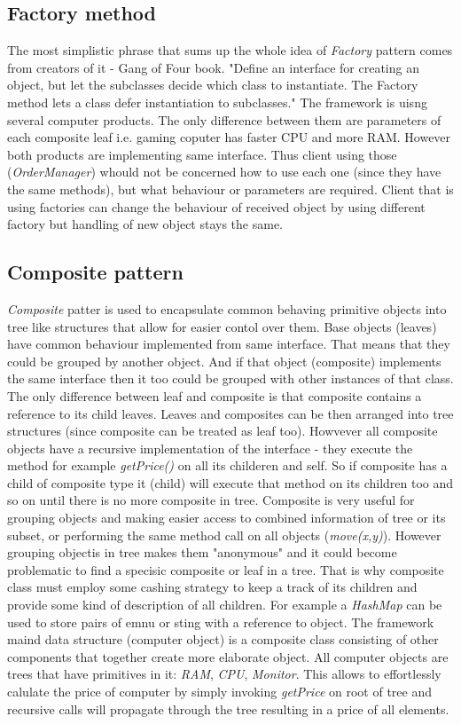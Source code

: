 \documentclass[pdftex,11pt,a4paper]{article}
\begin{document}
\subsection{Factory method}
The most simplistic phrase that sums up the whole idea of \emph{Factory} pattern comes from creators of it - Gang of Four book.
"Define an interface for creating an object, but let the subclasses decide which class to instantiate. The Factory method lets a class defer instantiation to subclasses."\cite{GOF_wika}
The framework is uisng several computer products. The only difference between them are parameters of each composite leaf i.e. gaming coputer has faster CPU and more RAM. However both products are implementing same interface. Thus client using those (\emph{OrderManager}) whould not be concerned how to use each one (since they have the same methods), but what behaviour or parameters are required. 
Client that is using factories can change the behaviour of received object by using different factory but handling of new object stays the same.

\subsection{Composite pattern}
\emph{Composite} patter is used to encapsulate common behaving primitive objects into tree like structures that allow for easier contol over them. Base objects (leaves) have common behaviour implemented from same interface. That means that they could be grouped by another object. And if that object (composite) implements the same interface then it too could be grouped with other instances of that class. The only difference between leaf and composite is that composite contains a reference to its child leaves.
Leaves and composites can be then arranged into tree structures (since composite can be treated as leaf too). Howvever all composite objects have a recursive implementation of the interface - they execute the method for example \emph{getPrice()} on all its childeren and self. So if composite has a child of composite type it (child) will execute that method on its children too and so on until there is no more composite in tree. 
Composite is very useful for grouping objects and making easier access to combined information of tree or its subset, or performing the same method call on all objects (\emph{move(x,y)}). 
However grouping objectis in tree makes them "anonymous" and it could become problematic to find a specisic composite or leaf in a tree. That is why composite class must employ some cashing strategy to keep a track of its children and provide some kind of description of all children. For example a \emph{HashMap} can be used to store pairs of emnu or sting with a reference to object.
The framework maind data structure (computer object) is a composite class consisting of other components that together create more elaborate object. All computer objects are trees that have primitives in it: \emph{RAM}, \emph{CPU}, \emph{Monitor}. This allows to effortlessly calulate the price of computer by simply invoking \emph{getPrice} on root of tree and recursive calls will propagate through the tree resulting in a price of all elements.
\end{document}
